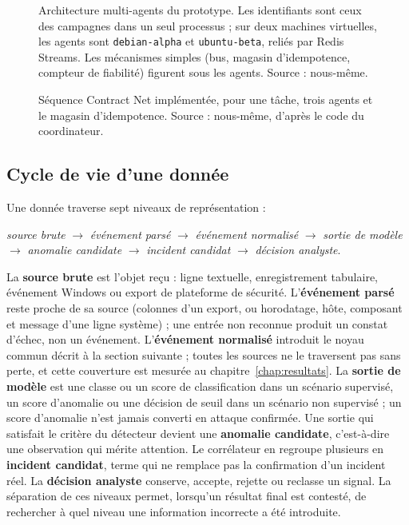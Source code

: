 \begin{figure}[H]
\centering

\caption[Architecture multi-agents du prototype.]{Architecture multi-agents du prototype. Les identifiants sont ceux des campagnes dans un seul processus ; sur deux machines virtuelles, les agents sont \texttt{debian-alpha} et \texttt{ubuntu-beta}, reliés par Redis Streams. Les mécanismes simples (bus, magasin d'idempotence, compteur de fiabilité) figurent sous les agents. Source : nous-même.}
\label{fig:architecture-multi-agent}
\end{figure}

\begin{figure}[H]
\centering

\caption[Séquence Contract Net implémentée.]{Séquence Contract Net implémentée, pour une tâche, trois agents et le magasin d'idempotence. Source : nous-même, d'après le code du coordinateur.}
\label{fig:contract-net-sequence}
\end{figure}

\subsection{Cycle de vie d'une donnée}

\label{sec:cycle-vie}

Une donnée traverse sept niveaux de représentation :
\begin{center}
\textit{source brute} $\rightarrow$ \textit{événement parsé} $\rightarrow$ \textit{événement normalisé} $\rightarrow$ \textit{sortie de modèle} $\rightarrow$ \textit{anomalie candidate} $\rightarrow$ \textit{incident candidat} $\rightarrow$ \textit{décision analyste}.
\end{center}
La \textbf{source brute} est l'objet reçu : ligne textuelle, enregistrement tabulaire, événement Windows ou export de plateforme de sécurité. L'\textbf{événement parsé} reste proche de sa source (colonnes d'un export, ou horodatage, hôte, composant et message d'une ligne système) ; une entrée non reconnue produit un constat d'échec, non un événement. L'\textbf{événement normalisé} introduit le noyau commun décrit à la section suivante ; toutes les sources ne le traversent pas sans perte, et cette couverture est mesurée au chapitre~\ref{chap:resultats}. La \textbf{sortie de modèle} est une classe ou un score de classification dans un scénario supervisé, un score d'anomalie ou une décision de seuil dans un scénario non supervisé ; un score d'anomalie n'est jamais converti en attaque confirmée. Une sortie qui satisfait le critère du détecteur devient une \textbf{anomalie candidate}, c'est-à-dire une observation qui mérite attention. Le corrélateur en regroupe plusieurs en \textbf{incident candidat}, terme qui ne remplace pas la confirmation d'un incident réel. La \textbf{décision analyste} conserve, accepte, rejette ou reclasse un signal. La séparation de ces niveaux permet, lorsqu'un résultat final est contesté, de rechercher à quel niveau une information incorrecte a été introduite.

